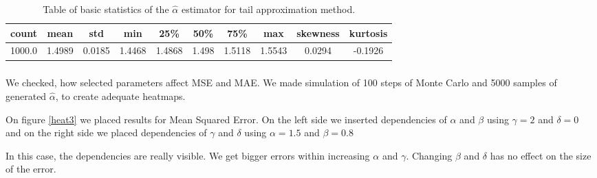 \documentclass{article}
\begin{document}
		\begin{table}[H]
			\centering
			\begin{tabular}{|c|c|c|c|c|c|c|c|c|c|}
				\hline
				count &      mean &       std &       min &       25\% &      50\% &     75\% & max & skewness & kurtosis
				\\\hline
				1000.0 &  1.4989 &  0.0185 &  1.4468 &  1.4868 &  1.498 &  1.5118 &  1.5543 & 0.0294 & -0.1926\\\hline
			\end{tabular}
			\caption{Table of basic statistics of the $\hat\alpha$ estimator for tail approximation method.}\label{tabelka2}
		\end{table}
	
		\subsubsection{}
		We checked, how selected parameters affect MSE and MAE. We made simulation of 100 steps of Monte Carlo and 5000 samples of generated $\hat\alpha$, to create adequate heatmaps.
        
        On figure \ref{heat3} we placed results for Mean Squared Error. On the left side we inserted dependencies of $\alpha$ and $\beta$ using $\gamma=2$ and $\delta=0$ and on the right side we placed dependencies of $\gamma$ and $\delta$ using $\alpha=1.5$ and $\beta=0.8$
        
        In this case, the dependencies are really visible. We get bigger errors within increasing $\alpha$ and $\gamma$. Changing $\beta$ and $\delta$ has no effect on the size of the error.
        
\end{document}
